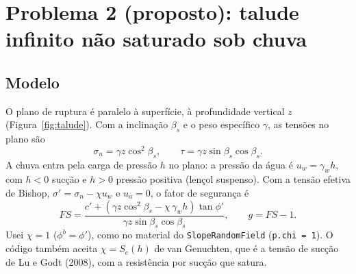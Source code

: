 \documentclass[11pt,a4paper]{article}
\begin{document}
\section{Problema 2 (proposto): talude infinito não saturado sob chuva}
\label{sec:talude}

\subsection{Modelo}
O plano de ruptura é paralelo à superfície, à profundidade vertical $z$ (Figura~\ref{fig:talude}). Com a inclinação
$\beta_s$ e o peso específico $\gamma$, as tensões no plano são
\[
  \sigma_n = \gamma z \cos^2\beta_s, \qquad \tau = \gamma z \sin\beta_s \cos\beta_s .
\]
A chuva entra pela carga de pressão $h$ no plano: a pressão da água é $u_w = \gamma_w h$, com $h < 0$ sucção e $h > 0$
pressão positiva (lençol suspenso). Com a tensão efetiva de Bishop, $\sigma' = \sigma_n - \chi u_w$ e $u_a = 0$, o
fator de segurança é
\begin{equation}
  FS = \frac{c' + (\gamma z \cos^2\beta_s - \chi\, \gamma_w h) \tan\phi'}{\gamma z \sin\beta_s \cos\beta_s},
  \qquad g = FS - 1 .
  \label{eq:fs}
\end{equation}
Usei $\chi = 1$ ($\phi^b = \phi'$), como no material do \texttt{SlopeRandomField} (\texttt{p.chi = 1}). O código
também aceita $\chi = S_e(h)$ de van Genuchten, que é a tensão de sucção de Lu e Godt (2008), com a resistência por
sucção que satura.
\end{document}
